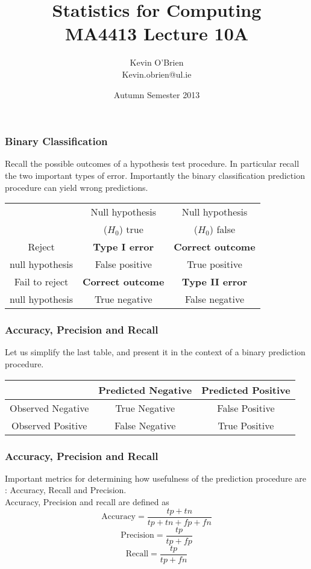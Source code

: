 \documentclass[a4]{beamer}
\title[MA4413]{Statistics for Computing \\ {\normalsize MA4413 Lecture 10A}}
\author[Kevin O'Brien]{Kevin O'Brien \\ {\scriptsize Kevin.obrien@ul.ie}}
\date{Autumn Semester 2013}
\institute[Maths \& Stats]{Dept. of Mathematics \& Statistics, \\ University \textit{of} Limerick}
\begin{document}
\begin{frame}
\titlepage
\end{frame}
\begin{frame}
	\frametitle{Binary Classification}
	Recall the possible outcomes of a hypothesis test procedure. In particular recall the two important types of error. Importantly the binary classification prediction procedure can yield wrong predictions.
	\begin{center}
		\begin{tabular}{|c|c|c|} \hline
			& Null hypothesis & Null hypothesis   \\
			& ($H_0$) true	 & ($H_0$) false \\ \hline
			Reject 	       & \textbf{Type I error }   & \textbf{Correct outcome} \\
			null hypothesis& False positive  & True positive \\ \hline
			Fail to reject & \textbf{Correct outcome} & \textbf{Type II error} \\
			null hypothesis & True negative  & False negative \\ \hline
		\end{tabular} 
	\end{center}
\end{frame}
\begin{frame}
	\frametitle{Accuracy, Precision and Recall}
	Let us simplify the last table, and present it in the context of a binary prediction procedure.
	\begin{center}
		\begin{tabular}{|c|c|c|}
			\hline  & Predicted Negative & Predicted Positive \\ 
			\hline Observed Negative & True Negative & False Positive \\ 
			\hline Observed Positive & False Negative & True Positive \\ 
			\hline 
		\end{tabular} 
	\end{center}
\end{frame}
\begin{frame}
	\frametitle{Accuracy, Precision and Recall}
	Important metrics for determining how usefulness of the prediction procedure are : Accuracy, Recall and Precision.
	\\
	Accuracy, Precision and recall are defined as
	\[\mbox{Accuracy}=\frac{tp+tn}{tp+tn+fp+fn} \]
	\[\mbox{Precision}=\frac{tp}{tp+fp} \] 
	\[\mbox{Recall}=\frac{tp}{tp+fn} \]
\end{frame}
\end{document}
